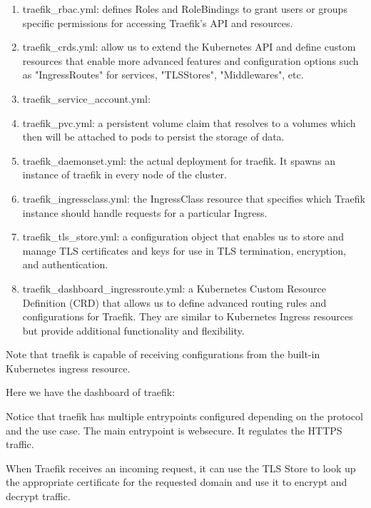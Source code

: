 \begin{enumerate}
\item traefik\_rbac.yml: defines Roles and RoleBindings to grant users or groups specific permissions for accessing Traefik's API and resources.
\item traefik\_crds.yml: allow us to extend the Kubernetes API and define custom resources that enable more advanced features and configuration options such as "IngressRoutes" for services, "TLSStores", "Middlewares", etc.
\item traefik\_service\_account.yml:  
\item traefik\_pvc.yml:  a persistent volume claim that resolves to a volumes which then will be attached to pods to persist the storage of data. 
\item traefik\_daemonset.yml: the actual deployment for traefik. It spawns an instance of traefik in every node of the cluster. 
\item traefik\_ingressclass.yml: the IngressClass resource that specifies which Traefik instance should handle requests for a particular Ingress. 
\item traefik\_tls\_store.yml: a configuration object that enables us to store and manage TLS certificates and keys for use in TLS termination, encryption, and authentication. 
\item traefik\_dashboard\_ingressroute.yml: a Kubernetes Custom Resource Definition (CRD) that allows us to define advanced routing rules and configurations for Traefik. They are similar to Kubernetes Ingress resources but provide additional functionality and flexibility. 
\end{enumerate}

 Note that traefik is capable of receiving configurations from the built-in Kubernetes ingress resource. 

Here we have the dashboard of traefik: 


Notice that traefik has multiple entrypoints configured depending on the protocol and the use case. The main entrypoint is websecure. It regulates the HTTPS traffic.  

When Traefik receives an incoming request, it can use the TLS Store to look up the appropriate certificate for the requested domain and use it to encrypt and decrypt traffic. 

